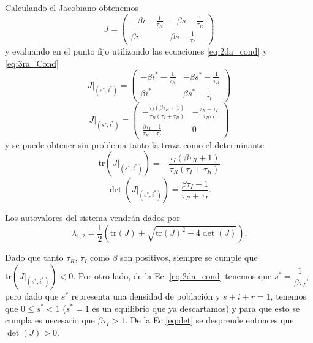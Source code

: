 Calculando el Jacobiano obtenemos
\begin{equation}
    J = \begin{pmatrix}
        -\beta i - \frac{1}{\tau_R} & -\beta s - \frac{1}{\tau_R} \\[6pt]
        \beta i                     & \beta s - \frac{1}{\tau_I}
    \end{pmatrix}
\end{equation}
y evaluando en el punto fijo utilizando las ecuaciones \ref{eq:2da_cond} y \ref{eq:3ra_Cond}
\begin{equation}
    J|_{\left(s^*,i^*\right)}  = \begin{pmatrix}
        -\beta i^* - \frac{1}{\tau_R} & -\beta s^* - \frac{1}{\tau_R} \\[6pt]
        \beta i^*                     & \beta s^* - \frac{1}{\tau_I}
    \end{pmatrix} 
\end{equation}
\begin{equation}
    J|_{\left(s^*,i^*\right)} = 
    \begin{pmatrix}
        -\frac{\tau_I \left( \beta \tau_R + 1 \right)}{\tau_R \left(\tau_I + \tau_R \right)} & -\frac{\tau_R + \tau_I}{\tau_R  \tau_I} \\[6pt]
        \frac{\beta \tau_I-1}{ \tau_R + \tau_I }                     & 0
    \end{pmatrix}
\end{equation}
y se puede obtener sin problema tanto la traza como el determinante
\begin{equation}
    \text{tr} \left(J|_{\left(s^*,i^*\right)}\right) = -\frac{\tau_I \left( \beta \tau_R + 1 \right)}{\tau_R \left(\tau_I + \tau_R \right)}
\end{equation}
\begin{equation}
    \det \left(J|_{\left(s^*,i^*\right)}\right) = \frac{\beta \tau_I - 1}{\tau_R + \tau_I}.
    \label{eq:det}
\end{equation}

Los autovalores del sistema vendrán dados por
\begin{equation}
    \lambda_{1,2} = \frac{1}{2} \left( \text{tr} (J) \pm \sqrt{\text{tr} (J) ^2 -4\det (J)}   \right).
\end{equation}

Dado que tanto $\tau_R$, $\tau_I$ como $\beta$ son positivos, siempre se cumple que $\text{tr} \left(J|_{\left(s^*,i^*\right)}\right) < 0$. Por otro lado, de la Ec. \ref{eq:2da_cond} tenemos que $s^*=\dfrac{1}{\beta \tau_I}$, pero dado que $s^*$ representa una densidad de población y $s+i+r=1$, tenemos que $0 \leq s^* < 1$ ($s^*=1$ es un equilibrio que ya descartamos) y para que esto se cumpla es necesario que $\beta \tau_I >1$. De la Ec \ref{eq:det} se desprende entonces que $\det (J) > 0$.

